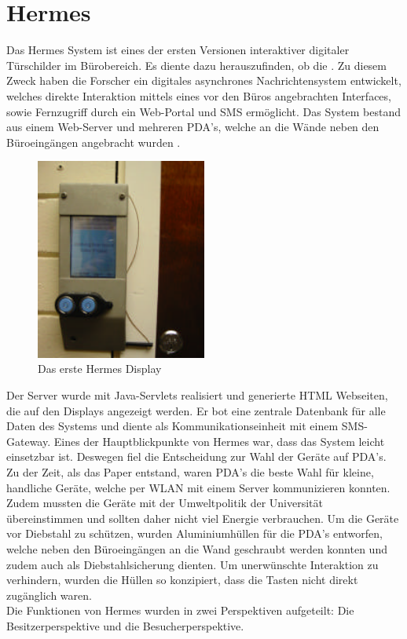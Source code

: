 \section{Hermes}
Das Hermes System\cite{cheverest:2003:paper,cheverest:2003:article,cheverest:2003:hermes,cheveres:2005:hermes-bluetooth} ist eines der ersten Versionen interaktiver digitaler Türschilder im Bürobereich.
Es diente dazu herauszufinden, ob die .
Zu diesem Zweck haben die Forscher ein digitales asynchrones Nachrichtensystem entwickelt, welches direkte Interaktion mittels eines vor den Büros angebrachten Interfaces, sowie Fernzugriff durch ein Web-Portal und SMS ermöglicht.
Das System bestand aus einem Web-Server und mehreren PDA's, welche an die Wände neben den Büroeingängen angebracht wurden .
\begin{figure}[h!]
  \centering
  \includegraphics[width=0.5\textwidth]{./img/hermes_display.png}
  \caption{Das erste Hermes Display\cite{cheverest:2003:paper}}
  \label{img:hermesDisplay}
\end{figure}
Der Server wurde mit Java-Servlets realisiert und generierte HTML Webseiten, die auf den Displays angezeigt werden. Er bot eine zentrale Datenbank für alle Daten des Systems und diente als Kommunikationseinheit mit einem SMS-Gateway.
Eines der Hauptblickpunkte von Hermes war, dass das System leicht einsetzbar ist. Deswegen fiel die Entscheidung zur Wahl der Geräte auf PDA's. Zu der Zeit, als das Paper entstand, waren PDA's die beste Wahl für kleine, handliche Geräte, welche per WLAN mit einem Server kommunizieren konnten. Zudem mussten die Geräte mit der Umweltpolitik der Universität übereinstimmen und sollten daher nicht viel Energie verbrauchen.
Um die Geräte vor Diebstahl zu schützen, wurden Aluminiumhüllen für die PDA's entworfen, welche neben den Büroeingängen an die Wand geschraubt werden konnten und zudem auch als Diebstahlsicherung dienten. Um unerwünschte Interaktion zu verhindern, wurden die Hüllen so konzipiert, dass die Tasten nicht direkt zugänglich waren.
\\
Die Funktionen von Hermes wurden in zwei Perspektiven aufgeteilt: Die Besitzerperspektive und die Besucherperspektive.
